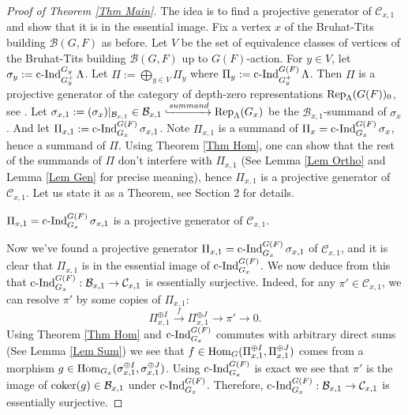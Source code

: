 \begin{proof}[Proof of Theorem \ref{Thm Main}]
	The idea is to find a projective generator of $\mathcal{C}_{x,1}$ and show that it is in the essential image. Fix a vertex $x$ of the Bruhat-Tits building $\mathcal{B}(G, F)$ as before. Let $V$ be the set of equivalence classes of vertices of the Bruhat-Tits building $\mathcal{B}(G, F)$ up to $G(F)$-action. For $y \in V$, let $\sigma_y:=\operatorname{\operatorname{c-Ind}}_{G_y^+}^{G_y}\Lambda$. Let $\Pi:=\bigoplus_{y \in V}\Pi_y$ where $\Pi_y:=\operatorname{\operatorname{c-Ind}}_{G_y^+}^{G(F)}\Lambda$. Then $\Pi$ is a projective generator of the category of depth-zero representations $\operatorname{\operatorname{Rep}}_{\Lambda}(G(F))_0$, see \cite[Appendix]{dat2009finitude}. Let $\sigma_{x,1}:=(\sigma_x)|_{\mathcal{B}_{x,1}} \in \mathcal{B}_{x,1} \xhookrightarrow{summand} \operatorname{\operatorname{Rep}}_{\Lambda}(G_x)$ be the $\mathcal{B}_{x,1}$-summand of $\sigma_x$. And let $\Pi_{x,1}:=\operatorname{\operatorname{c-Ind}}_{G_x}^{G(F)}\sigma_{x,1}$. Note $\Pi_{x,1}$ is a summand of $\Pi_x=\operatorname{\operatorname{c-Ind}}_{G_x}^{G(F)}\sigma_x$, hence a summand of $\Pi$. Using Theorem \ref{Thm Hom}, one can show that the rest of the summands of $\Pi$ don't interfere with $\Pi_{x,1}$ (See Lemma \ref{Lem Ortho} and Lemma \ref{Lem Gen} for precise meaning), hence $\Pi_{x,1}$ is a projective generator of $\mathcal{C}_{x,1}$. Let us state it as a Theorem, see Section 2 for details.
	
	\begin{theorem}\label{Thm Proj}
		$\Pi_{x,1}=\operatorname{\operatorname{c-Ind}}_{G_x}^{G(F)}\sigma_{x,1}$ is a projective generator of $\mathcal{C}_{x,1}$.
	\end{theorem}
	
	Now we've found a projective generator $\Pi_{x,1}=\operatorname{\operatorname{c-Ind}}_{G_x}^{G(F)}\sigma_{x,1}$ of $\mathcal{C}_{x,1}$, and it is clear that $\Pi_{x,1}$ is in the essential image of $\operatorname{\operatorname{c-Ind}}_{G_x}^{G(F)}$. We now deduce from this that $\operatorname{\operatorname{c-Ind}}_{G_x}^{G(F)}: \mathcal{B}_{x,1} \to \mathcal{C}_{x,1}$ is essentially surjective. Indeed, for any $\pi' \in \mathcal{C}_{x,1}$, we can resolve $\pi'$ by some copies of $\Pi_{x,1}$:
	$$\Pi_{x,1}^{\oplus I} \xrightarrow{f} \Pi_{x,1}^{\oplus J} \to \pi' \to 0.$$
	Using Theorem \ref{Thm Hom} and $\operatorname{\operatorname{c-Ind}}_{G_x}^{G(F)}$ commutes with arbitrary direct sums (See Lemma \ref{Lem Sum}) we see that $f \in \operatorname{\operatorname{Hom}}_G(\Pi_{x,1}^{\oplus I}, \Pi_{x,1}^{\oplus J})$ comes from a morphism $g \in \operatorname{\operatorname{Hom}}_{G_x}(\sigma_{x,1}^{\oplus I}, \sigma_{x,1}^{\oplus J})$. Using $\operatorname{\operatorname{c-Ind}}_{G_x}^{G(F)}$ is exact we see that $\pi'$ is the image of $\operatorname{coker}(g) \in \mathcal{B}_{x,1}$ under $\operatorname{\operatorname{c-Ind}}_{G_x}^{G(F)}$. Therefore, $\operatorname{\operatorname{c-Ind}}_{G_x}^{G(F)}: \mathcal{B}_{x,1} \to \mathcal{C}_{x,1}$ is essentially surjective.
	
    \end{proof}
	
